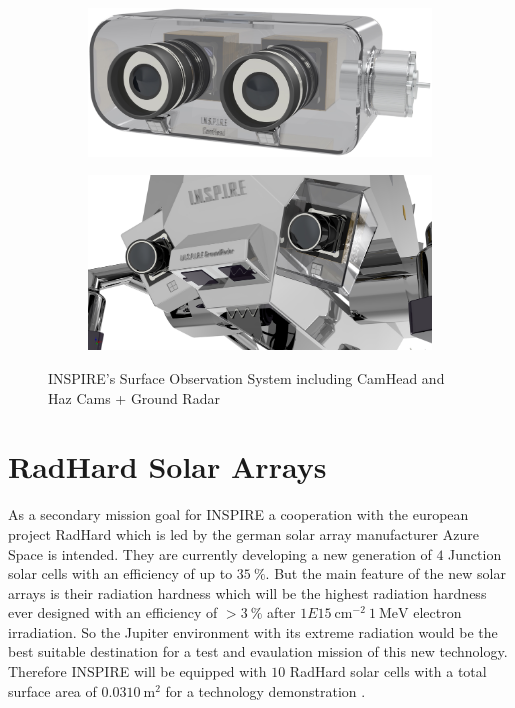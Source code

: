 \begin{figure}[htb]
     \centering
     \begin{subfigure}[b]{0.49\textwidth}
         \centering
         \includegraphics[width=\textwidth]{Media/CamHead}
         \label{fig:CamHead}
     \end{subfigure}
     \hfill
     \begin{subfigure}[b]{0.49\textwidth}
         \centering
         \includegraphics[width=\textwidth]{Media/HazCam_GroundRadar}
         \label{fig:HazCam}
     \end{subfigure}
     \hfill
     \caption{INSPIRE's Surface Observation System including CamHead and Haz Cams + Ground Radar}
     \label{fig:Observation}
\end{figure}

\section{RadHard Solar Arrays}
\label{subsec:radhard}
As a secondary mission goal for INSPIRE a cooperation with the european project RadHard which is led by the german solar array manufacturer Azure Space is intended. They are currently developing a new generation of $4$ Junction solar cells with an efficiency of up to $35~\% $. But the main feature of the new solar arrays is their radiation hardness which will be the highest radiation hardness ever designed with an efficiency of $>3~\% $ after $1E15~\text{cm}^{-2} \ 1~\text{MeV}$ electron irradiation. So the Jupiter environment with its extreme radiation would be the best suitable destination for a test and evaulation mission of this new technology. Therefore INSPIRE will be equipped with $10$ RadHard solar cells with a total surface area of $0.0310~\text{m}^2$ for a technology demonstration \cite{FraunhoferInstituteforSolarEnergySystemsISE.2021}.

